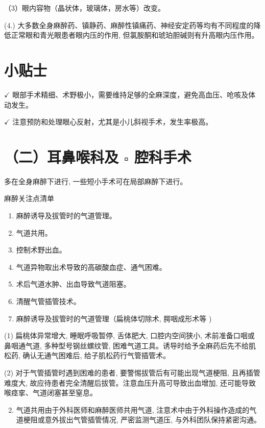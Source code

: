 \documentclass[10pt]{article}
\begin{document}
（3）眼内容物（晶状体，玻璃体，房水等）改变。

(4.) 大多数全身麻醉药、镇静药、麻醉性镇痛药、神经安定药等均有不同程度的降低正常眼和青光眼患者眼内压的作用, 但氯胺酮和琥珀胆碱则有升高眼内压作用。

\section*{小贴士}
$\checkmark$ 眼部手术精细、术野极小，需要维持足够的全麻深度，避免高血压、呛咳及体动发生。

$\checkmark$ 注意预防和处理眼心反射，尤其是小儿斜视手术，发生率极高。

\section*{（二）耳鼻喉科及 $\square$ 腔科手术}
多在全身麻醉下进行, 一些短小手术可在局部麻醉下进行。

麻醉关注点清单

\begin{enumerate}
  \item 麻醉诱导及拔管时的气道管理。

  \item 气道共用。

  \item 控制术野出血。

  \item 气道异物取出术导致的高碳酸血症、通气困难。

  \item 术后气道水肿、出血导致气道阻塞。

  \item 清醒气管插管技术。

  \item 麻醉诱导及拔管时的气道管理（扁桃体切除术, 腭咽成形术等 )

\end{enumerate}

(1) 扁桃体异常增大, 睡眠呼吸暂停, 舌体肥大, 口腔内空间狭小, 术前准备口咽或鼻咽通气道, 多种型号钢丝螺纹管, 困难气道工具。诱导时给予全麻药后先不给肌松药, 确认无通气困难后, 给子肌松药行气管插管术。

(2) 对于气管插管时遇到困难的患者, 要警惕拔管后有可能出现气道梗阻, 且再插管难度大, 故应待患者完全清醒后拔管。注意血压升高可导致出血增加, 还可能导致喉痉挛、气道闭塞甚至窒息。

\begin{enumerate}
  \setcounter{enumi}{1}
  \item 气道共用由于外科医师和麻醉医师共用气道, 注意术中由于外科操作造成的气道梗阻或意外拔出气管插管情况, 严密监测气道压, 与外科团队保持紧密沟通。
\end{enumerate}
\end{document}
